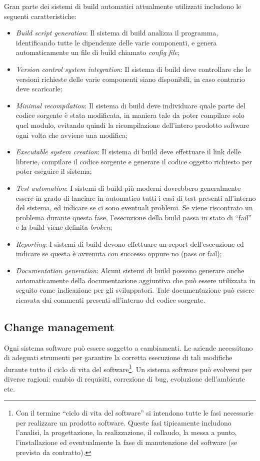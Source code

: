 Gran parte dei sistemi di build automatici attualmente utilizzati includono le seguenti caratteristiche:
\begin{itemize}
	\item \emph{Build script generation}: Il sistema di build analizza il programma,
	identificando tutte le dipendenze delle varie componenti, e genera automaticamente un file di build chiamato \emph{config file};
	\item \emph{Version control system integration}: Il sistema di build deve controllare che le versioni richieste delle varie componenti siano disponibili, in caso contrario deve scaricarle;
	\item \emph{Minimal recompilation}: Il sistema di build deve individuare quale parte del codice sorgente è stata modificata, in maniera tale da poter compilare solo quel modulo, evitando quindi la ricompilazione dell’intero prodotto software ogni volta che avviene una modifica;
	\item \emph{Executable system creation}: Il sistema di build deve effettuare il link delle librerie, compilare il codice sorgente e generare il codice oggetto richiesto
	per poter eseguire il sistema;
	\item \emph{Test automation}: I sistemi di build più moderni dovrebbero generalmente essere in grado di lanciare in automatico tutti i casi di test presenti all’interno
	del sistema, ed indicare se ci sono eventuali problemi. Se viene riscontrato un problema durante questa fase, l’esecuzione della build passa in stato di “fail” e la build viene definita \emph{broken};
	\item \emph{Reporting}: I sistemi di build devono effettuare un report dell’esecuzione ed indicare se questa è avvenuta con successo oppure no (pass or fail);
	\item \emph{Documentation generation}: Alcuni sistemi di build possono generare anche automaticamente della documentazione aggiuntiva che può essere utilizzata in seguito come indicazione per gli sviluppatori. Tale documentazione può essere ricavata dai commenti presenti all’interno del codice sorgente.
\end{itemize}
\subsection{Change management}
Ogni sistema software può essere soggetto a cambiamenti. Le aziende
necessitano di adeguati strumenti per garantire la corretta esecuzione di tali modifiche durante tutto il ciclo di vita del software\footnote{Con il termine “ciclo di vita del software” si intendono tutte le fasi necessarie per realizzare un prodotto software. Queste fasi tipicamente includono l’analisi, la progettazione, la realizzazione, il collaudo, la messa a punto, l'installazione ed eventualmente la fase di manutenzione del software (se prevista da contratto).}. Un sistema software può evolversi per diverse ragioni: cambio di requisiti, correzione di bug, evoluzione
dell’ambiente etc.

